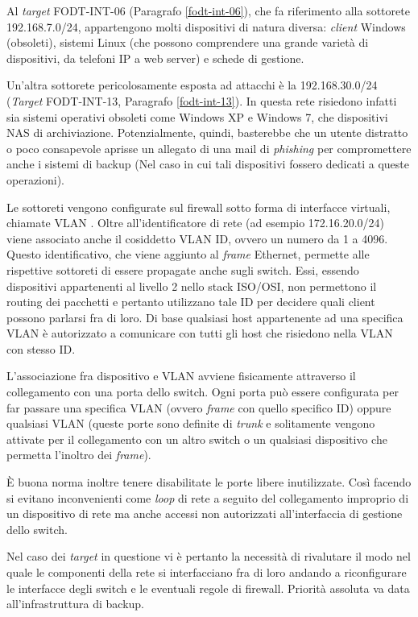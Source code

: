 \documentclass[target=bach,aauheader=]{thud}
\begin{document}
Al \textit{target} FODT-INT-06 (Paragrafo \ref{fodt-int-06}), che fa riferimento alla sottorete 192.168.7.0/24, appartengono molti dispositivi di natura diversa: \textit{client} Windows (obsoleti), sistemi Linux (che possono comprendere una grande varietà di dispositivi, da telefoni IP a web server) e schede di gestione.

Un'altra sottorete pericolosamente esposta ad attacchi è la 192.168.30.0/24 (\textit{Target} FODT-INT-13, Paragrafo \ref{fodt-int-13}). In questa rete risiedono infatti sia sistemi operativi obsoleti come Windows XP e Windows 7, che dispositivi NAS di archiviazione. Potenzialmente, quindi, basterebbe che un utente distratto o poco consapevole aprisse un allegato di una mail di \textit{phishing} per compromettere anche i sistemi di backup (Nel caso in cui tali dispositivi fossero dedicati a queste operazioni).

Le sottoreti vengono configurate sul firewall sotto forma di interfacce virtuali, chiamate VLAN \cite{cybercreativa}\cite{reti}. Oltre all'identificatore di rete (ad esempio 172.16.20.0/24) viene associato anche il cosiddetto VLAN ID, ovvero un numero da 1 a 4096. Questo identificativo, che viene aggiunto al \textit{frame} Ethernet, permette alle rispettive sottoreti di essere propagate anche sugli switch. Essi, essendo dispositivi appartenenti al livello 2 nello stack ISO/OSI, non permettono il routing dei pacchetti e pertanto utilizzano tale ID per decidere quali client possono parlarsi fra di loro. Di base qualsiasi host appartenente ad una specifica VLAN è autorizzato a comunicare con tutti gli host che risiedono nella VLAN con stesso ID.

L'associazione fra dispositivo e VLAN avviene fisicamente attraverso il collegamento con una porta dello switch. Ogni porta può essere configurata per far passare una specifica VLAN (ovvero \textit{frame} con quello specifico ID) oppure qualsiasi VLAN (queste porte sono definite di \textit{trunk} e solitamente vengono attivate per il collegamento con un altro switch o un qualsiasi dispositivo che permetta l'inoltro dei \textit{frame}).

È buona norma inoltre tenere disabilitate le porte libere inutilizzate. Così facendo si evitano inconvenienti come \textit{loop} di rete a seguito del collegamento improprio di un dispositivo di rete ma anche accessi non autorizzati all'interfaccia di gestione dello switch. 

Nel caso dei \textit{target} in questione vi è pertanto la necessità di rivalutare il modo nel quale le componenti della rete si interfacciano fra di loro andando a riconfigurare le interfacce degli switch e le eventuali regole di firewall. Priorità assoluta va data all'infrastruttura di backup.
\end{document}
